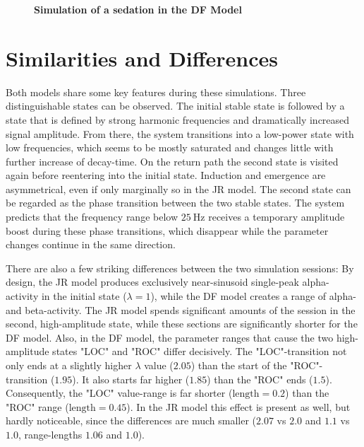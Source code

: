 \begin{figure}[H]

\caption{\textbf{Simulation of a sedation in the DF Model}
}\label{fig:sedation_sim_df}
\end{figure}

\section{Similarities and Differences}
    Both models share some key features during these simulations.
    Three distinguishable states can be observed.
    The initial stable state is followed by a state that is defined by strong harmonic frequencies and dramatically
    increased signal amplitude.
    From there, the system transitions into a low-power state with low frequencies,
    which seems to be mostly saturated and changes little with further increase of decay-time.
    On the return path the second state is visited again before reentering into the initial state.
    Induction and emergence are asymmetrical, even if only marginally so in the JR model.
    The second state can be regarded as the phase transition between the two stable states.
    The system predicts that the frequency range below $\SI{25}{\hertz}$ receives a temporary amplitude boost during
    these phase transitions, which disappear while the parameter changes continue in the same direction.


There are also a few striking differences between the two simulation sessions:
By design,
the JR model produces exclusively near-sinusoid single-peak alpha-activity in the initial state ($\lambda = 1$),
while the DF model creates a range of alpha- and beta-activity.
The JR model spends significant amounts of the session in the second, high-amplitude state,
while these sections are significantly shorter for the DF model.
Also, in the DF model,
the parameter ranges that cause the two high-amplitude states "LOC" and "ROC" differ decisively.
The "LOC"-transition not only ends at a slightly higher $\lambda$ value ($2.05$) than the start of the
"ROC"-transition ($1.95$).
It also starts far higher ($1.85$) than the "ROC" ends ($1.5$).
Consequently, the "LOC" value-range is far shorter ($\text{length}=0.2$) than the "ROC" range
($\text{length}=0.45$).
In the JR model this effect is present as well, but hardly noticeable,
since the differences are much smaller ($2.07$ vs $2.0$ and $1.1$ vs $1.0$, range-lengths $1.06$ and $1.0$).



